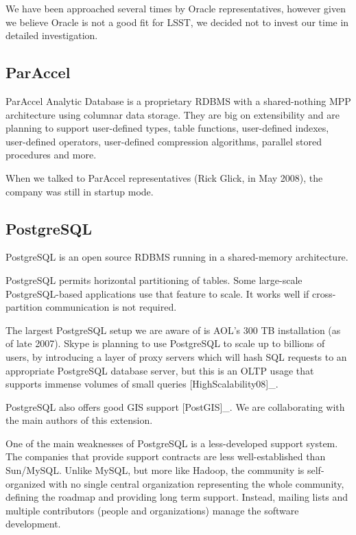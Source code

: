 \documentclass[DM,lsstdraft,toc]{lsstdoc}
\begin{document}
We have been approached several times by Oracle representatives, however
given we believe Oracle is not a good fit for LSST, we decided not to
invest our time in detailed investigation.

\subsection{ParAccel}\label{paraccel}

ParAccel Analytic Database is a proprietary RDBMS with a shared-nothing
MPP architecture using columnar data storage. They are big on
extensibility and are planning to support user-defined types, table
functions, user-defined indexes, user-defined operators, user-defined
compression algorithms, parallel stored procedures and more.

When we talked to ParAccel representatives (Rick Glick, in May 2008),
the company was still in startup mode.

\subsection{PostgreSQL}\label{postgresql}

PostgreSQL is an open source RDBMS running in a shared-memory
architecture.

PostgreSQL permits horizontal partitioning of tables. Some large-scale
PostgreSQL-based applications use that feature to scale. It works well
if cross-partition communication is not required.

The largest PostgreSQL setup we are aware of is AOL's 300 TB
installation (as of late 2007). Skype is planning to use PostgreSQL to
scale up to billions of users, by introducing a layer of proxy servers
which will hash SQL requests to an appropriate PostgreSQL database
server, but this is an OLTP usage that supports immense volumes of small
queries {[}HighScalability08{]}\_.

PostgreSQL also offers good GIS support {[}PostGIS{]}\_. We are
collaborating with the main authors of this extension.

One of the main weaknesses of PostgreSQL is a less-developed support
system. The companies that provide support contracts are less
well-established than Sun/MySQL. Unlike MySQL, but more like Hadoop, the
community is self-organized with no single central organization
representing the whole community, defining the roadmap and providing
long term support. Instead, mailing lists and multiple contributors
(people and organizations) manage the software development.
\end{document}
